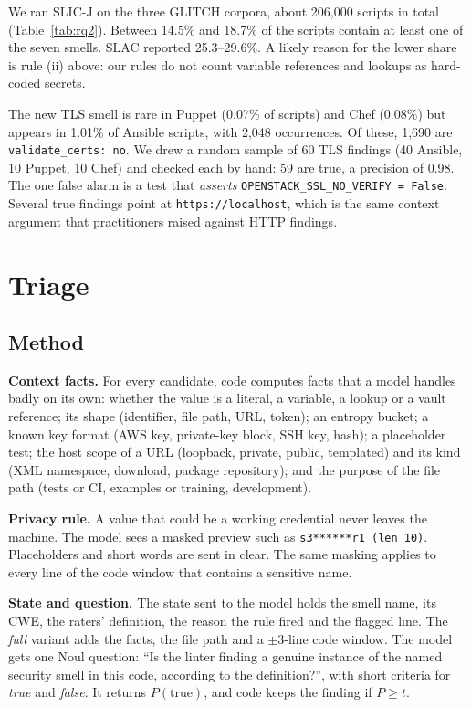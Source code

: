 \documentclass[conference]{IEEEtran}
\newcommand{\slicj}{SLIC-J}
\begin{document}
We ran \slicj{} on the three GLITCH corpora, about 206{,}000 scripts in total (Table~\ref{tab:rq2}). Between 14.5\% and
18.7\% of the scripts contain at least one of the seven smells. SLAC reported 25.3--29.6\%. A likely reason for the
lower share is rule (ii) above: our rules do not count variable references and lookups as hard-coded secrets.

The new TLS smell is rare in Puppet (0.07\% of scripts) and Chef (0.08\%) but appears in 1.01\% of Ansible scripts,
with 2{,}048 occurrences. Of these, 1{,}690 are \texttt{validate\_certs: no}. We drew a random sample of 60 TLS
findings (40 Ansible, 10 Puppet, 10 Chef) and checked each by hand: 59 are true, a precision of 0.98. The one false
alarm is a test that \emph{asserts} \texttt{OPENSTACK\_SSL\_NO\_VERIFY = False}. Several true findings point at
\texttt{https://localhost}, which is the same context argument that practitioners raised against HTTP findings.

\section{Triage}\label{sec:triage}
\subsection{Method}
\textbf{Context facts.} For every candidate, code computes facts that a model handles badly on its own: whether the
value is a literal, a variable, a lookup or a vault reference; its shape (identifier, file path, URL, token); an
entropy bucket; a known key format (AWS key, private-key block, SSH key, hash); a placeholder test; the host scope of
a URL (loopback, private, public, templated) and its kind (XML namespace, download, package repository); and the
purpose of the file path (tests or CI, examples or training, development).

\textbf{Privacy rule.} A value that could be a working credential never leaves the machine. The model sees a masked
preview such as \texttt{s3******r1 (len 10)}. Placeholders and short words are sent in clear. The same masking applies
to every line of the code window that contains a sensitive name.

\textbf{State and question.} The state sent to the model holds the smell name, its CWE, the raters' definition, the
reason the rule fired and the flagged line. The \emph{full} variant adds the facts, the file path and a
$\pm3$-line code window. The model gets one Noul question: ``Is the linter finding a genuine instance of the named
security smell in this code, according to the definition?'', with short criteria for \emph{true} and \emph{false}. It
returns $P(\text{true})$, and code keeps the finding if $P\ge t$.
\end{document}
